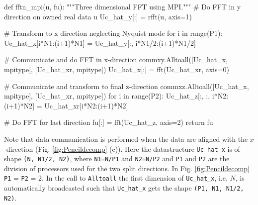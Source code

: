 \documentclass[11pt, oneside]{article}
\newcommand{\inpyth}{\lstinline[style=pythonstyle, basicstyle=\ttfamily]} %[]%
\begin{document}
\begin{python}
def fftn_mpi(u, fu):
    """Three dimensional FFT using MPI."""
    # Do FFT in y direction on owned real data u
    Uc_hat_y[:] = rfft(u, axis=1)

    # Transform to x direction neglecting Nyquist mode
    for i in range(P1):
        Uc_hat_x[i*N1:(i+1)*N1] = Uc_hat_y[:, i*N1/2:(i+1)*N1/2]

    # Communicate and do FFT in x-direction
    commxy.Alltoall([Uc_hat_x, mpitype], [Uc_hat_xr, mpitype])
    Uc_hat_x[:] = fft(Uc_hat_xr, axis=0)

    # Communicate and transform to final z-direction
    commxz.Alltoall([Uc_hat_x, mpitype], [Uc_hat_xr, mpitype])
    for i in range(P2):
        Uc_hat_z[:, :, i*N2:(i+1)*N2] = Uc_hat_xr[i*N2:(i+1)*N2]

    # Do FFT for last direction
    fu[:] = fft(Uc_hat_z, axis=2)
    return fu
\end{python}
Note that data communication is performed when the data are aligned with the $x$-direction (Fig. \ref{fig:Pencildecomp} (c)). Here the datastructure \inpyth{Uc_hat_x} is of shape \inpyth{(N, N1/2, N2)}, where \inpyth{N1=N/P1} and \inpyth{N2=N/P2} and \inpyth{P1} and \inpyth{P2} are the division of processors used for the two split directions. In Fig. \ref{fig:Pencildecomp} \inpyth{P1} = \inpyth{P2} = 2. In the call to \inpyth{Alltoall} the first dimension of \inpyth{Uc_hat_x}, i.e. $N$, is automatically broadcasted such that \inpyth{Uc_hat_x} gets the shape \inpyth{(P1, N1, N1/2, N2)}.

\appendix
\end{document}
